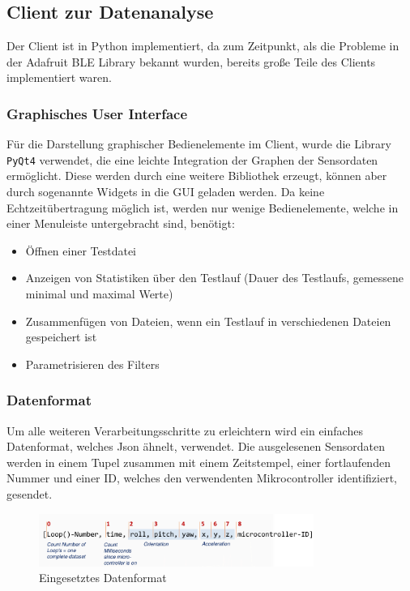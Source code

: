 \subsection{Client zur Datenanalyse}
Der Client ist in Python implementiert, da zum Zeitpunkt, als die Probleme in der Adafruit BLE Library bekannt wurden, bereits große Teile des Clients implementiert waren.
\subsubsection{Graphisches User Interface}
Für die Darstellung graphischer Bedienelemente im Client, wurde die Library \texttt{PyQt4} verwendet, die eine leichte Integration der Graphen der Sensordaten ermöglicht. Diese werden durch eine weitere Bibliothek erzeugt, können aber durch sogenannte Widgets in die GUI geladen werden.
Da keine Echtzeitübertragung möglich ist, werden nur wenige Bedienelemente, welche in einer Menuleiste untergebracht sind, benötigt:
\begin{itemize}
\item Öffnen einer Testdatei
\item Anzeigen von Statistiken über den Testlauf (Dauer des Testlaufs, gemessene minimal und maximal Werte)
\item Zusammenfügen von Dateien, wenn ein Testlauf in verschiedenen Dateien gespeichert ist
\item Parametrisieren des Filters
\end{itemize}
\subsubsection{Datenformat}
Um alle weiteren Verarbeitungsschritte zu erleichtern wird ein einfaches Datenformat, welches Json ähnelt, verwendet. Die ausgelesenen Sensordaten werden in einem Tupel zusammen mit einem Zeitstempel, einer fortlaufenden Nummer und einer ID, welches den verwendenten Mikrocontroller identifiziert, gesendet.
\begin{figure}[h]
	\centering
	\includegraphics[width=0.8\textwidth]{images/k3-datenformat.png}
	\caption {Eingesetztes Datenformat}
	\label{fig:k3-datenformat.png} 
\end{figure}
